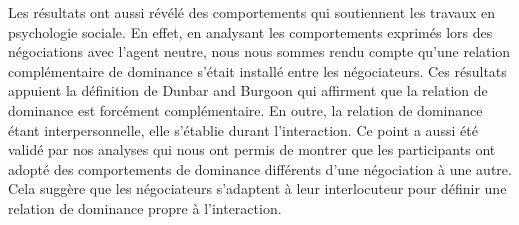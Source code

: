 	Les résultats ont aussi révélé des comportements qui soutiennent les travaux en psychologie sociale. En effet, en analysant les comportements exprimés lors des négociations avec l'agent neutre, nous nous sommes rendu compte qu'une relation complémentaire de dominance s'était installé entre les négociateurs. Ces résultats appuient la définition de Dunbar and Burgoon \cite{dunbar2005perceptions} qui affirment que la relation de dominance est forcément complémentaire. En outre, la relation de dominance étant interpersonnelle, elle s'établie durant l'interaction. Ce point a aussi été validé par nos analyses qui nous ont permis de montrer que les participants ont adopté des comportements de dominance différents d'une négociation à une autre. Cela suggère que les négociateurs s'adaptent à leur interlocuteur pour définir une relation de dominance propre à l'interaction. 